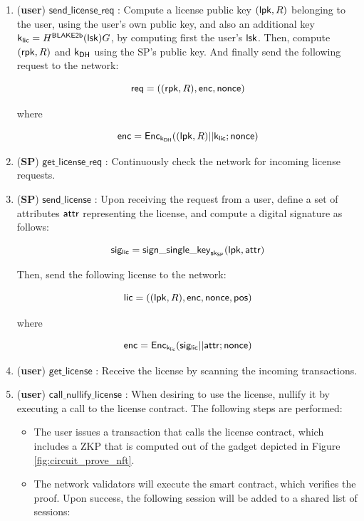 \begin{enumerate}
	\item (\textbf{user}) $\mathsf{send\_license\_req}$ : Compute a license public key $(\mathsf{lpk}, R)$ belonging to the user, using the user's own public key, and also an additional key $\mathsf{k}_{\mathsf{lic}} = H^\mathsf{BLAKE2b}(\mathsf{lsk})G$, by computing first the user's $\mathsf{lsk}$. Then, compute $(\mathsf{rpk}, R)$ and $\mathsf{k_{DH}}$ using the SP's public key. And finally send the following request to the network:


		$$\mathsf{req} = ((\mathsf{rpk}, R), \mathsf{enc}, \mathsf{nonce})$$

	where 

		$$\mathsf{enc} = \mathsf{Enc}_{\mathsf{k_{DH}}} ((\mathsf{lpk}, R)||\mathsf{k}_{\mathsf{lic}}; \mathsf{nonce})$$


	\item (\textbf{SP}) $\mathsf{get\_license\_req}$ : Continuously check the network for incoming license requests.

	\item (\textbf{SP}) $\mathsf{send\_license}$ : Upon receiving the request from a user, define a set of attributes $\mathsf{attr}$ representing the license, and compute a digital signature as follows:

		$$\mathsf{sig_{lic}} = \mathsf{sign\_single\_key}_{\mathsf{sk}_{\mathsf{SP}}}(\mathsf{lpk}, \mathsf{attr})$$

	Then, send the following license to the network:

		$$\mathsf{lic} = ((\mathsf{lpk}, R), \mathsf{enc}, \mathsf{nonce}, \mathsf{pos})$$

	where 

		$$\mathsf{enc} = \mathsf{Enc}_{\mathsf{k}_{\mathsf{lic}}} (\mathsf{sig_{lic}} || \mathsf{attr}; \mathsf{nonce})$$

	\item (\textbf{user}) $\mathsf{get\_license}$ : Receive the license by scanning the incoming transactions.

	\item (\textbf{user}) $\mathsf{call\_nullify\_license}$ : When desiring to use the license, nullify it by executing a call to the license contract. The following steps are performed:

	\begin{itemize}
		\item The user issues a transaction that calls the license contract, which includes a ZKP that is computed out of the gadget depicted in Figure \ref{fig:circuit_prove_nft}.
		\item The network validators will execute the smart contract, which verifies the proof. Upon success, the following session will be added to a shared list of sessions:


\end{itemize}
\end{enumerate}
